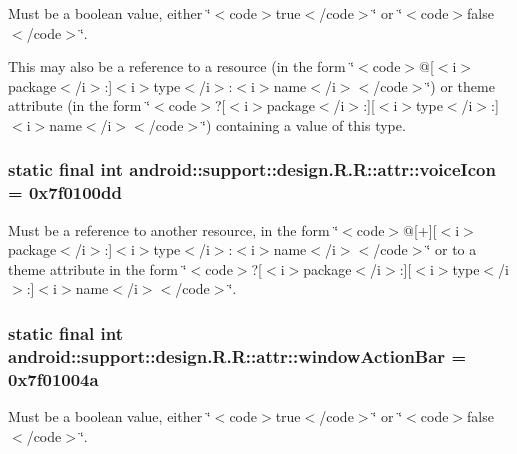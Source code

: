 Must be a boolean value, either \char`\"{}$<$code$>$true$<$/code$>$\char`\"{} or \char`\"{}$<$code$>$false$<$/code$>$\char`\"{}. 

This may also be a reference to a resource (in the form \char`\"{}$<$code$>$@\mbox{[}$<$i$>$package$<$/i$>$:\mbox{]}$<$i$>$type$<$/i$>$:$<$i$>$name$<$/i$>$$<$/code$>$\char`\"{}) or theme attribute (in the form \char`\"{}$<$code$>$?\mbox{[}$<$i$>$package$<$/i$>$:\mbox{]}\mbox{[}$<$i$>$type$<$/i$>$:\mbox{]}$<$i$>$name$<$/i$>$$<$/code$>$\char`\"{}) containing a value of this type. \hypertarget{classandroid_1_1support_1_1design_1_1_r_1_1attr_79dc402041826965c8cf2ce3335cd1ba}{
\subsubsection[{voiceIcon}]{\setlength{\rightskip}{0pt plus 5cm}static final int android::support::design.R.R::attr::voiceIcon = 0x7f0100dd}}
\label{classandroid_1_1support_1_1design_1_1_r_1_1attr_79dc402041826965c8cf2ce3335cd1ba}


Must be a reference to another resource, in the form \char`\"{}$<$code$>$@\mbox{[}+\mbox{]}\mbox{[}$<$i$>$package$<$/i$>$:\mbox{]}$<$i$>$type$<$/i$>$:$<$i$>$name$<$/i$>$$<$/code$>$\char`\"{} or to a theme attribute in the form \char`\"{}$<$code$>$?\mbox{[}$<$i$>$package$<$/i$>$:\mbox{]}\mbox{[}$<$i$>$type$<$/i$>$:\mbox{]}$<$i$>$name$<$/i$>$$<$/code$>$\char`\"{}. \hypertarget{classandroid_1_1support_1_1design_1_1_r_1_1attr_daf693ba2e39b7031360ed0348ae79be}{
\subsubsection[{windowActionBar}]{\setlength{\rightskip}{0pt plus 5cm}static final int android::support::design.R.R::attr::windowActionBar = 0x7f01004a}}
\label{classandroid_1_1support_1_1design_1_1_r_1_1attr_daf693ba2e39b7031360ed0348ae79be}


Must be a boolean value, either \char`\"{}$<$code$>$true$<$/code$>$\char`\"{} or \char`\"{}$<$code$>$false$<$/code$>$\char`\"{}. 

